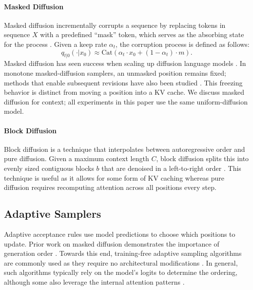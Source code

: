 \paragraph{Masked Diffusion}
Masked diffusion incrementally corrupts a sequence by replacing tokens in sequence $X$ with a predefined ``mask'' token, which serves as the absorbing state for the process \citep{campbell2022continuous, sahoo2024simple, shi2024simplified}.
Given a keep rate $\alpha_t$, the corruption process is defined as follows:
\[
q_{t|0}(\cdot | x_0) \approx \text{Cat} \left( \alpha_t \cdot x_0 + (1 - \alpha_t) \cdot m\right).
\]
Masked diffusion has seen success when scaling up diffusion language models \citep{nie2026large, ye2025dream7bdiffusionlarge}.
In monotone masked-diffusion samplers, an unmasked position remains fixed; methods that enable subsequent revisions have also been studied \citep{kim2025fine}. This freezing behavior is distinct from moving a position into a KV cache. We discuss masked diffusion for context; all experiments in this paper use the same uniform-diffusion model.

\paragraph{Block Diffusion}
Block diffusion is a technique that interpolates between autoregressive order and pure diffusion. Given a maximum context length $C$, block diffusion splits this into evenly sized contiguous blocks $b$ that are denoised in a left-to-right order \citep{arriola2025blockdiffusioninterpolatingautoregressive, deschenaux2026blockgen}.
This technique is useful as it allows for some form of KV caching whereas pure diffusion requires recomputing attention across all positions every step.

\subsection{Adaptive Samplers}
Adaptive acceptance rules use model predictions to choose which positions to update. Prior work on masked diffusion demonstrates the importance of generation order \citep{kim2025train}.
Towards this end, training-free adaptive sampling algorithms are commonly used as they require no architectural modifications \citep{nie2026large, ye2025dream7bdiffusionlarge}.
In general, such algorithms typically rely on the model's logits to determine the ordering, although some also leverage the internal attention patterns \citep{kim2026klass, wu2026fast}.

